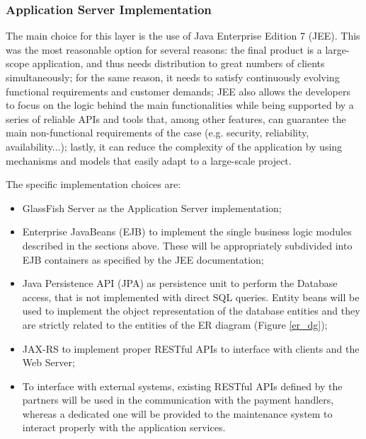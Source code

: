 \subsubsection{Application Server Implementation}
The main choice for this layer is the use of Java Enterprise Edition 7 (JEE). This was the most reasonable option for several reasons: the final product is a large-scope application, and thus needs distribution to great numbers of clients simultaneously; for the same reason, it needs to satisfy continuously evolving functional requirements and customer demands; JEE also allows the developers to focus on the logic behind the main functionalities while being supported by a series of reliable APIs and tools that, among other features, can guarantee the main non-functional requirements of the case (e.g. security, reliability, availability...); lastly, it can reduce the complexity of the application by using mechanisms and models that easily adapt to a large-scale project.

The specific implementation choices are:
\begin{itemize}
\item GlassFish Server as the Application Server implementation;
\item Enterprise JavaBeans (EJB) to implement the single business logic modules described in the sections above. These will be appropriately subdivided into EJB containers as specified by the JEE documentation;
\item Java Persistence API (JPA) as persistence unit to perform the Database access, that is not implemented with direct SQL queries. Entity beans will be used to implement the object representation of the database entities and they are strictly related to the entities of the ER diagram (Figure \ref{er_dg});
\item JAX-RS to implement proper RESTful APIs to interface with clients and the Web Server;
\item To interface with external systems, existing RESTful APIs defined by the partners will be used in the communication with the payment handlers, whereas a dedicated one will be provided to the maintenance system to interact properly with the application services.
\end{itemize}

